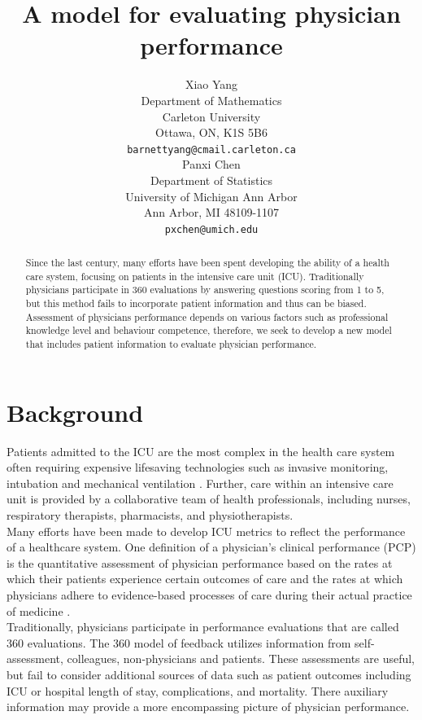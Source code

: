 \documentclass{article}
\title{A model for evaluating physician performance}
\author{%
  Xiao Yang \\
  Department of Mathematics\\
  Carleton University\\
  Ottawa, ON, K1S 5B6 \\
  \texttt{barnettyang@cmail.carleton.ca} \\
\And
Panxi Chen\\
 Department of Statistics \\
 University of Michigan Ann Arbor \\
 Ann Arbor, MI 48109-1107 \\
 \texttt{pxchen@umich.edu} \\
}
\begin{document}
\maketitle

\begin{abstract}
Since the last century, many efforts have been spent developing the ability of a health care
system, focusing on patients in the intensive care unit (ICU). Traditionally physicians participate
in 360 evaluations by answering questions scoring from 1 to 5, but this method fails to
incorporate patient information and thus can be biased. Assessment of physicians performance
depends on various factors such as professional knowledge level and behaviour competence,
therefore, we seek to develop a new model that includes patient information to evaluate
physician performance.
\end{abstract}

\section{Background}
  Patients admitted to the ICU are the most complex in the health care system often requiring expensive lifesaving technologies such as invasive monitoring, intubation and mechanical ventilation \cite{Jacobs}. Further, care within an intensive care unit is provided by a collaborative team of health professionals, including nurses, respiratory therapists, pharmacists, and physiotherapists. \\

  Many efforts have been made to develop ICU metrics to reflect the performance of a healthcare system. One definition of a physician's clinical performance (PCP) is the quantitative assessment of physician performance based on the rates at which their patients experience certain outcomes of care and the rates at which physicians adhere to evidence-based processes of care during their actual practice of medicine \cite{Street}. \\
  
  Traditionally, physicians participate in performance evaluations that are called 360 evaluations. The 360 model of feedback utilizes information from self-assessment, colleagues, non-physicians and patients. These assessments are useful, but fail to consider additional sources of data such as patient outcomes including ICU or hospital length of stay, complications, and mortality. There auxiliary information may provide a more encompassing picture of physician performance.  \\
  
\end{document}
